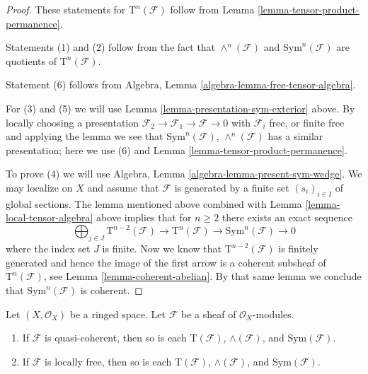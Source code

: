 \begin{proof}
These statements for $\text{T}^n(\mathcal{F})$ follow
from Lemma \ref{lemma-tensor-product-permanence}.

\medskip\noindent
Statements (1) and (2) follow from the fact that
$\wedge^n(\mathcal{F})$ and $\text{Sym}^n(\mathcal{F})$
are quotients of $\text{T}^n(\mathcal{F})$.

\medskip\noindent
Statement (6) follows from
Algebra, Lemma \ref{algebra-lemma-free-tensor-algebra}.

\medskip\noindent
For (3) and (5) we will use
Lemma \ref{lemma-presentation-sym-exterior} above.
By locally choosing a presentation
$\mathcal{F}_2 \to \mathcal{F}_1 \to \mathcal{F} \to 0$
with $\mathcal{F}_i$ free, or finite free and applying the
lemma we see that $\text{Sym}^n(\mathcal{F})$, $\wedge^n(\mathcal{F})$
has a similar presentation; here we use (6) and
Lemma \ref{lemma-tensor-product-permanence}.

\medskip\noindent
To prove (4) we will use
Algebra, Lemma \ref{algebra-lemma-present-sym-wedge}.
We may localize on $X$ and assume that
$\mathcal{F}$ is generated by a finite set
$(s_i)_{i \in I}$ of global sections.
The lemma mentioned above
combined with Lemma \ref{lemma-local-tensor-algebra} above
implies that for $n \geq 2$
there exists an exact sequence
$$
\bigoplus\nolimits_{j \in J}
\text{T}^{n - 2}(\mathcal{F})
\to
\text{T}^n(\mathcal{F})
\to
\text{Sym}^n(\mathcal{F})
\to
0
$$
where the index set $J$ is finite. Now we know that
$\text{T}^{n - 2}(\mathcal{F})$ is finitely generated
and hence the image of the first arrow is a coherent
subsheaf of $\text{T}^n(\mathcal{F})$, see Lemma \ref{lemma-coherent-abelian}.
By that same lemma we conclude that $\text{Sym}^n(\mathcal{F})$ is
coherent.
\end{proof}

\begin{lemma}
\label{lemma-whole-tensor-algebra-permanence}
Let $(X, \mathcal{O}_X)$ be a ringed space.
Let $\mathcal{F}$ be a sheaf of $\mathcal{O}_X$-modules.
\begin{enumerate}
\item If $\mathcal{F}$ is quasi-coherent,
then so is each $\text{T}(\mathcal{F})$,
$\wedge(\mathcal{F})$, and $\text{Sym}(\mathcal{F})$.
\item If $\mathcal{F}$ is locally free,
then so is each $\text{T}(\mathcal{F})$,
$\wedge(\mathcal{F})$, and $\text{Sym}(\mathcal{F})$.
\end{enumerate}
\end{lemma}

